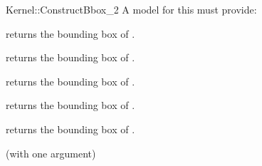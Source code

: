 \begin{ccRefFunctionObjectConcept}{Kernel::ConstructBbox_2}
A model for this must provide:



 {returns the bounding box of .}

 {returns the bounding box of .}

 {returns the bounding box of .}

 {returns the bounding box of .}

 {returns the bounding box of .}


\ccRefines
{} (with one argument)



\end{ccRefFunctionObjectConcept}
